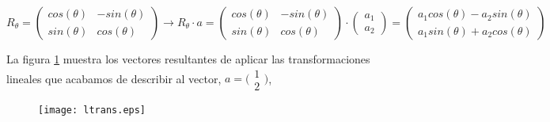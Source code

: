 \begin{equation*}
R_{\theta}=\begin{pmatrix}
cos(\theta)& -sin(\theta)\\
sin(\theta)& cos(\theta)
\end{pmatrix} \rightarrow R_{\theta}\cdot a = \begin{pmatrix}
cos(\theta)& -sin(\theta)\\
sin(\theta)& cos(\theta)
\end{pmatrix} \cdot \begin{pmatrix}
a_1\\
a_2
\end{pmatrix}= \begin{pmatrix}
a_1cos(\theta)-a_2sin(\theta)\\
a_1sin(\theta)+a_2cos(\theta)
\end{pmatrix}
\end{equation*}


La figura \ref{fig:ltrans} muestra los vectores resultantes de aplicar las transformaciones lineales que acabamos de describir al vector,  $ a=\bigl( \begin{smallmatrix}
1\\
2
\end{smallmatrix} \bigr)$,

\begin{figure}[h]
\centering
\texttt{[image: ltrans.eps]}
\label{fig:ltrans}
\end{figure}

